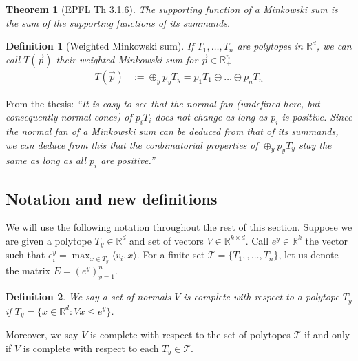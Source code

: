 \documentclass[12pt]{article}
\newcommand{\reals}{\mathbb{R}}
\newcommand{\T}{\mathcal{T}}
\newcommand{\inprod}[2]{\langle #1, #2 \rangle}%
\newtheorem{theorem}{Theorem}
\newtheorem{definition}{Definition}
\begin{document}
\begin{theorem}[EPFL Th 3.1.6]\label{thm:support-minksum}
  The supporting function of a Minkowski sum is the sum of the supporting functions of its summands.
\end{theorem}

\begin{definition}[Weighted Minkowski sum]
  If $T_1, \ldots, T_n$ are polytopes in $\reals^d$, we can call $T(\vec p)$ their \emph{weighted} Minkowski sum for $\vec p \in \reals^n_+$
  \begin{align*}
    T(\vec p) &:= \oplus_y p_y T_y = p_1 T_1 \oplus \ldots \oplus p_n T_n
  \end{align*}
\end{definition}

  From the thesis:  \emph{``It is easy to see that the normal fan (undefined here, but consequently normal cones) of $p_i T_i$ does not change as long as $p_i$ is positive.  Since the normal fan of a Minkowski sum can be deduced from that of its summands, we can deduce from this that the conbimatorial properties of $\oplus_y p_y T_y$ stay the same as long as all $p_i$ are positive.''}


  \subsection{Notation and new definitions}
  We will use the following notation throughout the rest of this section.
  Suppose we are given a polytope $T_y \in \reals^d$ and set of vectors $V \in \reals^{k \times d}$.
  Call $e^y \in \reals^k$ the vector such that $e^y_i = \max_{x \in T_y}\inprod{v_i}{x}$.  
  For a finite set $\T = \{T_1, , \ldots, T_n\}$, let us denote the matrix $E = (e^y)_{y=1}^n$.
  \begin{definition}
    We say a set of normals $V$ is \emph{complete} with respect to a polytope $T_y$ if $T_y = \{x \in \reals^d: Vx \leq e^y\}$.
  \end{definition}
  Moreover, we say $V$ is complete with respect to the set of polytopes $\T$ if and only if $V$ is complete with respect to each $T_y \in \T$.

  \iffalse
\end{document}
